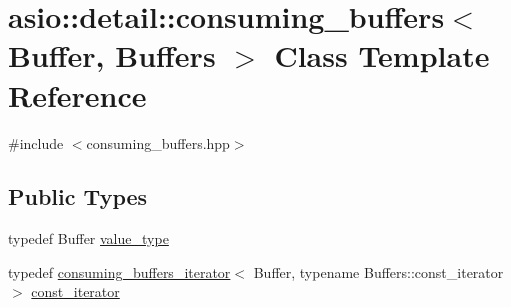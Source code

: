 \hypertarget{classasio_1_1detail_1_1consuming__buffers}{}\section{asio\+:\+:detail\+:\+:consuming\+\_\+buffers$<$ Buffer, Buffers $>$ Class Template Reference}
\label{classasio_1_1detail_1_1consuming__buffers}


{\ttfamily \#include $<$consuming\+\_\+buffers.\+hpp$>$}

\subsection*{Public Types}
\begin{DoxyCompactItemize}
\item 
typedef Buffer \hyperlink{classasio_1_1detail_1_1consuming__buffers_a3063fd648bf703fb9c861db934f61ed5}{value\+\_\+type}
\item 
typedef \hyperlink{classasio_1_1detail_1_1consuming__buffers__iterator}{consuming\+\_\+buffers\+\_\+iterator}$<$ Buffer, typename Buffers\+::const\+\_\+iterator $>$ \hyperlink{classasio_1_1detail_1_1consuming__buffers_a0abc4cc4aed2717a1de4b38d78f3d525}{const\+\_\+iterator}
\end{DoxyCompactItemize}
